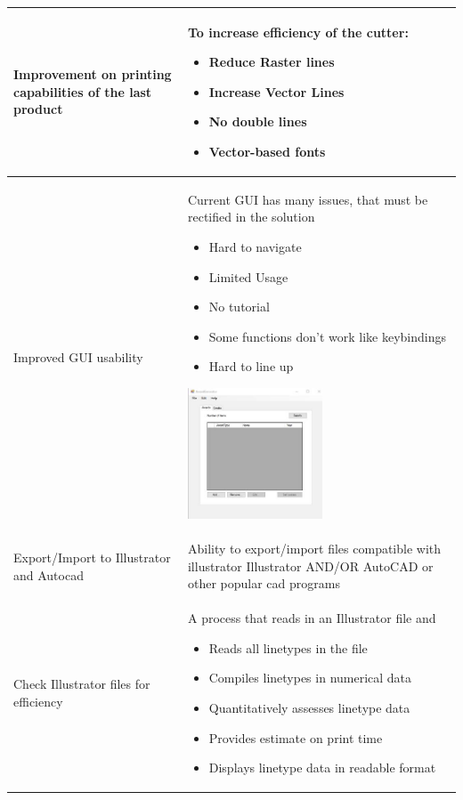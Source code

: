 \documentclass[oneside,openany,11pt,a4paper]{report}
\begin{document}
\begin{longtable}{|p{4cm}|p{10cm}|}
    Improvement on printing capabilities of the last product & To increase efficiency of the cutter: 
  \begin{itemize}
  	\itemsep0em
  	\item Reduce Raster lines
  	\item Increase Vector Lines
  	\item No double lines
  	\item Vector-based fonts
  \end{itemize} \\ \hline


  Improved GUI usability & Current GUI has many issues, that must be rectified in the solution
\begin{itemize}
	\itemsep0em
	\item Hard to navigate
	\item Limited Usage
	\item No tutorial
	\item Some functions don't work like keybindings
	\item Hard to line up
\end{itemize} 
	\begin{center} \includegraphics[width=4cm]{examplegui.png}
	\end{center}

 \\ \hline
 
  Export/Import to Illustrator and Autocad & Ability to export/import files compatible with illustrator Illustrator
  AND/OR AutoCAD or other popular cad programs
	 \\ \hline
	 
	 
	 Check Illustrator files for efficiency & A process that reads in an Illustrator file and
	 \begin{itemize}
	 	\itemsep0em
	 	\item Reads all linetypes in the file
	 	\item Compiles linetypes in numerical data
	 	\item Quantitatively assesses linetype data
	 	\item Provides estimate on print time
	 	\item Displays linetype data in readable format
	 \end{itemize} \\ \hline
 

\end{longtable}
\end{document}

